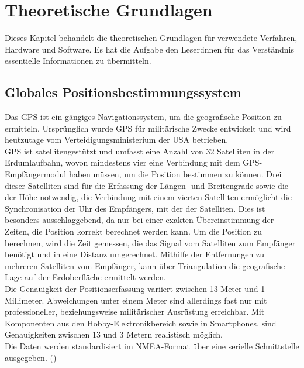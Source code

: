 \section{Theoretische Grundlagen}
\label{sec:theoretGrundl}
Dieses Kapitel behandelt die theoretischen Grundlagen für verwendete Verfahren, Hardware und Software. Es hat die Aufgabe den Leser:innen für das Verständnis essentielle Informationen zu übermitteln.
\subsection{Globales Positionsbestimmungssystem}
\label{subsec:tGPS}
Das \ac{GPS} ist ein gängiges Navigationssystem, um die geografische Position zu ermitteln. Ursprünglich wurde \ac{GPS} für militärische Zwecke entwickelt und wird heutzutage vom Verteidigungsministerium der USA betrieben.\\
\ac{GPS} ist satellitengestützt und umfasst eine Anzahl von 32 Satelliten in der Erdumlaufbahn, wovon mindestens vier eine Verbindung mit dem GPS-Empfängermodul haben müssen, um die Position bestimmen zu können. Drei dieser Satelliten sind für die Erfassung der Längen- und Breitengrade sowie die der Höhe notwendig, die Verbindung mit einem vierten Satelliten ermöglicht die Synchronisation der Uhr des Empfängers, mit der der Satelliten. Dies ist besonders ausschlaggebend, da nur bei einer exakten Übereinstimmung der Zeiten, die Position korrekt berechnet werden kann. Um die Position zu berechnen, wird die Zeit gemessen, die das Signal vom Satelliten zum Empfänger benötigt und in eine Distanz umgerechnet. Mithilfe der Entfernungen zu mehreren Satelliten vom Empfänger, kann über Triangulation die geografische Lage auf der Erdoberfläche ermittelt werden.\\
Die Genauigkeit der Positionserfassung variiert zwischen 13 Meter und 1 Millimeter. Abweichungen unter einem Meter sind allerdings fast nur mit professioneller, beziehungsweise militärischer Ausrüstung erreichbar. Mit Komponenten aus den Hobby-Elektronikbereich sowie in Smartphones, sind Genauigkeiten zwischen 13 und 3 Metern realistisch möglich.\\
Die Daten werden standardisiert im \ac{NMEA}-Format über eine serielle Schnittstelle ausgegeben. (\cite{schnabelGPS})



